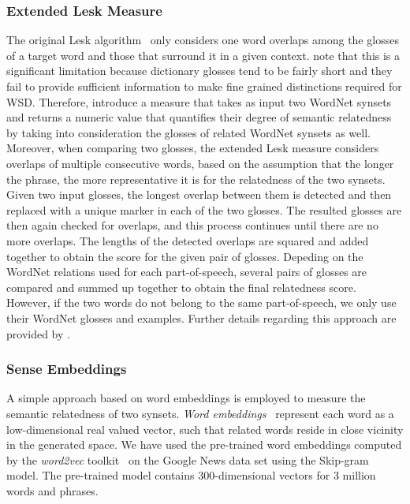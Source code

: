 \documentclass[11pt]{article}
\begin{document}
\subsubsection{Extended Lesk Measure}

The original Lesk algorithm~\cite{Lesk-1986} only considers one word overlaps among the glosses of a target word and those that surround it in a given context.  note that this is a significant limitation because dictionary glosses tend to be fairly short and they fail to provide sufficient information to make fine grained distinctions required for WSD. Therefore,  introduce a measure that takes as input two WordNet synsets and returns a numeric value that quantifies their degree of semantic relatedness by taking into consideration the glosses of related WordNet synsets as well. Moreover, when comparing two glosses, the extended Lesk measure considers overlaps of multiple consecutive words, based on the assumption that the longer the phrase, the more representative it is for the relatedness of the two synsets. Given two input glosses, the longest overlap between them is detected and then replaced with a unique marker in each of the two glosses. The resulted glosses are then again checked for overlaps, and this process continues until there are no more overlaps. The lengths of the detected overlaps are squared and added together to obtain the score for the given pair of glosses. Depeding on the WordNet relations used for each part-of-speech, several pairs of glosses are compared and summed up together to obtain the final relatedness score. However, if the two words do not belong to the same part-of-speech, we only use their WordNet glosses and examples. Further details regarding this approach are provided by .

\subsubsection{Sense Embeddings} 

A simple approach based on word embeddings is employed to measure the semantic relatedness of two synsets. \emph{Word embeddings}~\cite{Bengio-JMLR-2003,Collobert-ICML-2008,Mikolov-NIPS-2013} represent each word as a low-dimensional real valued vector, such that related words reside in close vicinity in the generated space. We have used the pre-trained word embeddings computed by the \emph{word2vec} toolkit~\cite{Mikolov-NIPS-2013} on the Google News data set using the Skip-gram model. The pre-trained model contains $300$-dimensional vectors for $3$ million words and phrases.
\end{document}
